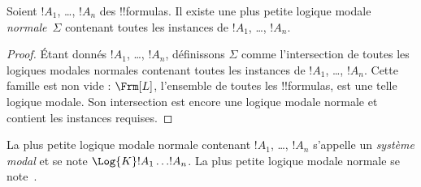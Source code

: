 \documentclass[../../../include/open-logic-section]{subfiles}
\begin{document}
\begin{prop}
  Soient $!A_1$, \dots, $!A_n$ des !!{formula}s. Il existe une plus
  petite logique modale \emph{normale}~$\Sigma$ contenant toutes les
  instances de $!A_1$, \dots, $!A_n$.
\end{prop}

\begin{proof}
  Étant donnés $!A_1$, \dots, $!A_n$, définissons $\Sigma$ comme
  l'intersection de toutes les logiques modales normales contenant
  toutes les instances de $!A_1$, \dots, $!A_n$. Cette famille est
  non vide :
  $\Frm[L]$, l'ensemble de toutes les !!{formula}s, est une telle
  logique modale. Son intersection est encore une logique modale
  normale et contient les instances requises.
\end{proof}

\begin{defn}
La plus petite logique modale normale contenant $!A_1$, \dots,
$!A_n$ s'appelle un \emph{système modal} et se note
$\Log{K} !A_1 \dots !A_n$. La plus petite logique modale normale se
note~.
\end{defn}
\end{document}
